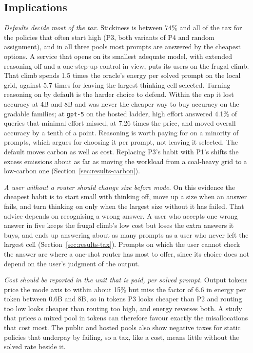 \subsection{Implications}
\label{sec:implications}

\emph{Defaults decide most of the tax.} Stickiness is between 74\% and all
of the tax for the policies that often start high (P3, both variants of P4
and random assignment), and in all three pools most prompts are answered
by the cheapest options. A service that opens on its
smallest adequate model, with extended reasoning off and a one-step-up
control in view, puts its users on the frugal climb. That climb spends 1.5
times the oracle's energy per solved prompt on the local grid, against 5.7
times for leaving the largest thinking cell selected. Turning reasoning on
by default is the harder choice to defend. Within the cap it lost accuracy
at 4B and 8B and was never the cheaper way to buy accuracy on the gradable
families; at \texttt{gpt-5} on the hosted ladder, high effort answered 4.1\%
of queries that minimal effort missed, at 7.26 times the price, and moved
overall accuracy by a tenth of a point. Reasoning is worth paying for
on a minority of prompts, which argues for choosing it per prompt, not
leaving it selected. The default moves carbon as well as cost. Replacing
P3's habit with P1's shifts the excess emissions about as far as moving
the workload from a coal-heavy grid to a low-carbon one
(Section~\ref{sec:results-carbon}).

\emph{A user without a router should change size before mode.} On this
evidence the cheapest habit is to start small with thinking off, move up a
size when an answer fails, and turn thinking on only when the largest size
without it has failed. That advice depends on recognising a wrong answer. A
user who accepts one wrong answer in five keeps the frugal climb's low cost
but loses the extra answers it buys, and ends up answering about as many
prompts as a user who never left the largest cell
(Section~\ref{sec:results-tax}). Prompts on which the user cannot check the
answer are where a one-shot router has most to offer, since its choice does
not depend on the user's judgment of the output.

\emph{Cost should be reported in the unit that is paid, per solved prompt.}
Output tokens price the mode axis to within about 15\% but miss the factor
of 6.6 in energy per token between 0.6B and 8B, so in tokens P3 looks
cheaper than P2 and routing too low looks cheaper than routing too high,
and energy reverses both. A study that prices a mixed pool in tokens
can therefore favour exactly the misallocations that cost most. The public
and hosted pools also show negative taxes for static policies that underpay
by failing, so a tax, like a cost, means little without the solved rate
beside it.

